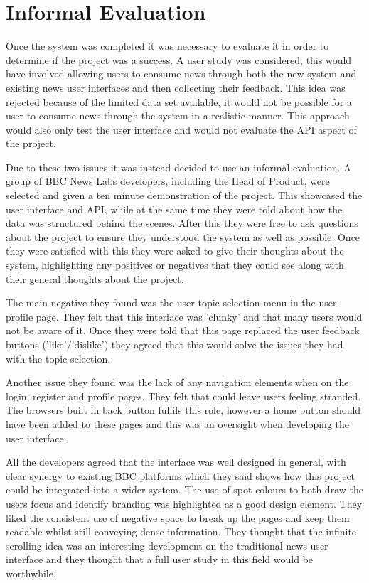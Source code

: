 \documentclass[12pt,titlepage]{article}
\begin{document}
\section{Informal Evaluation}

  Once the system was completed it was necessary to evaluate it in order to
  determine if the project was a success. A user study was considered, this would
  have involved allowing users to consume news through both the new system and
  existing news user interfaces and then collecting their feedback. This idea
  was rejected because of the limited data set available, it would not be
  possible for a user to consume news through the system in a realistic manner.
  This approach would also only test the user interface and would not evaluate
  the API aspect of the project.

  Due to these two issues it was instead decided to use an informal evaluation.
  A group of BBC News Labs developers, including the Head of Product, were
  selected and given a ten minute demonstration of the project. This showcased
  the user interface and API, while at the same time they were told about how
  the data was structured behind the scenes. After this they were free to ask
  questions about the project to ensure they understood the system as well as
  possible. Once they were satisfied with this they were asked to give their
  thoughts about the system, highlighting any positives or negatives that they
  could see along with their general thoughts about the project.

  The main negative they found was the user topic selection menu in the user
  profile page. They felt that this interface was 'clunky' and that many users
  would not be aware of it. Once they were told that this page replaced the user
  feedback buttons ('like'/'dislike') they agreed that this would solve the
  issues they had with the topic selection.

  Another issue they found was the lack of any navigation elements when on the
  login, register and profile pages. They felt that could leave users feeling
  stranded. The browsers built in back button fulfils this role, however a home
  button should have been added to these pages and this was an oversight when
  developing the user interface.

  All the developers agreed that the interface was well designed in general,
  with clear synergy to existing BBC platforms which they said shows how this
  project could be integrated into a wider system. The use of spot colours to
  both draw the users focus and identify branding was highlighted as a good
  design element. They liked the consistent use of negative space to break up
  the pages and keep them readable whilst still conveying dense information.
  They thought that the infinite scrolling idea was an interesting development
  on the traditional news user interface and they thought that a full user study
  in this field would be worthwhile.
\end{document}
